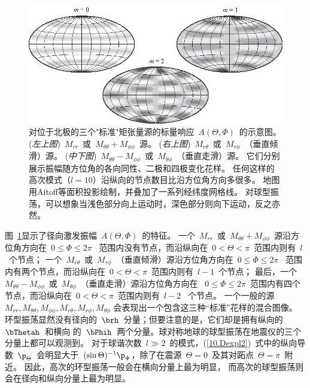 \begin{figure}[!t]
\begin{center}
\includegraphics{../figures/chap10/fig02.eps}
\end{center}
\caption[black&white]{\label{10.fig.blackwhite}
对位于北极的三个"标准"矩张量源的标量响应~$A(\Theta,\Phi)$~的示意图。
({\em 左上图\/})~$M_{rr}$~或~$M_{\theta\theta}+M_{\phi\phi}$~源。
({\em 右上图\/})~$M_{r\theta}$~或~$M_{r\phi}$~（垂直倾滑）源。
({\em 中下图\/})~$M_{\theta\theta}-M_{\phi\phi}$~或~$M_{\theta\phi}$~（垂直走滑）源。
它们分别展示振幅随方位角的各向同性、二极和四极变化花样。
任何这样的高次模式（$l=10$）沿纵向的节点数目比沿方位角方向多很多。
地图用Aitoff等面积投影绘制，并叠加了一系列经纬度网格线。
对球型振荡，可以想象当浅色部分向上运动时，深色部分则向下运动，反之亦然。}
\end{figure}

图~\ref{10.fig.blackwhite}显示了径向激发振幅~$A(\Theta,\Phi)$~的特征。
一个~$M_{rr}$~或~$M_{\theta\theta}+M_{\phi\phi}$~源沿方位角方向在~$0\leq \Phi\leq 2\pi$ ~范围内没有节点，而沿纵向在~$0<\Theta<\pi$~范围内则有~$l$~个节点；
一个~$M_{r\theta}$~或~$M_{r\phi}$~（垂直倾滑）源沿方位角方向在~$0\leq \Phi\leq 2\pi$ ~范围内有两个节点，而沿纵向在~$0<\Theta<\pi$~范围内则有~$l-1$~个节点；
最后，一个~$M_{\theta\theta}-M_{\phi\phi}$~或~$M_{\theta\phi}$~（垂直走滑）源沿方位角方向在 ~$0\leq \Phi\leq 2\pi$~范围内有四个节点，而沿纵向在~$0<\Theta<\pi$~范围内则有~$l-2$ ~个节点。
一个一般的源$M_{rr},M_{\theta\theta},M_{\phi\phi}, M_{r\theta},M_{r\phi},M_{\theta\phi}$ 会表现出一个包含这三种“标准”花样的混合图像。
环型振荡显然没有径向的~$\brh$~分量；但要注意的是，它们却是拥有纵向的~$\bThetah$~和横向 的~$\bPhih$~两个分量。球对称地球的球型振荡在地震仪的三个分量上都可以观测到。
对于球谐次数~$l\gg 2$~的模式，(\ref{10.Dexpl2})~式中的纵向导数~$\p_{\Theta}$~会明显大于~$(\sin\Theta)^{-1}\p_{\Phi}$，除了在震源~$\Theta=0$~及其对跖点~$\Theta=\pi$~附近。
%
因此，高次的环型振荡一般会在横向分量上最为明显，
而高次的球型振荡则会在径向和纵向分量上最为明显。\vspace{-0.5mm}

